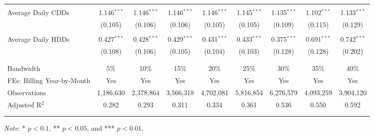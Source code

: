 {\begin{table}[t!]
\begin{adjustbox}{scale = 0.85}
\begin{threeparttable}
\begin{tabular}{@{\extracolsep{5pt}}lcccccccc}
                    & & & & & & & & \\ 
                    Average Daily CDDs & 1.146$^{***}$ & 1.146$^{***}$ & 1.146$^{***}$ & 1.146$^{***}$ & 1.145$^{***}$ & 1.135$^{***}$ & 1.102$^{***}$ & 1.133$^{***}$ \\ 
                    & (0.105) & (0.106) & (0.106) & (0.105) & (0.105) & (0.109) & (0.115) & (0.129) \\ 
                    & & & & & & & & \\ 
                    Average Daily HDDs & 0.427$^{***}$ & 0.428$^{***}$ & 0.429$^{***}$ & 0.431$^{***}$ & 0.433$^{***}$ & 0.375$^{***}$ & 0.691$^{***}$ & 0.742$^{***}$ \\ 
                    & (0.108) & (0.106) & (0.105) & (0.104) & (0.103) & (0.128) & (0.128) & (0.202) \\ 
                    & & & & & & & & \\
                    \hline
                    \\[-2.0ex]
                    Bandwidth & 5\% & 10\% & 15\% & 20\% & 25\% & 30\% & 35\% & 40\% \\ 
                    FEs: Billing Year-by-Month & Yes & Yes & Yes & Yes & Yes & Yes & Yes & Yes \\ 
                    Observations & 1,186,630 & 2,378,864 & 3,566,318 & 4,702,081 & 5,816,854 & 6,276,579 & 4,093,259 & 3,904,120 \\ 
                    Adjusted R$^{2}$ & 0.282 & 0.293 & 0.311 & 0.334 & 0.361 & 0.536 & 0.550 & 0.592 \\
                    \\[-2.0ex]
                    \hline \hline
                    \\[-4.5ex]
                \end{tabular}
                \begin{tablenotes}[flushleft]
                    \footnotesize
                    \item \textit{Note}: * $p < 0.1$, ** $p < 0.05$, and *** $p < 0.01$.
                \end{tablenotes}
            \end{threeparttable}
        \end{adjustbox}
    \end{table}
}
